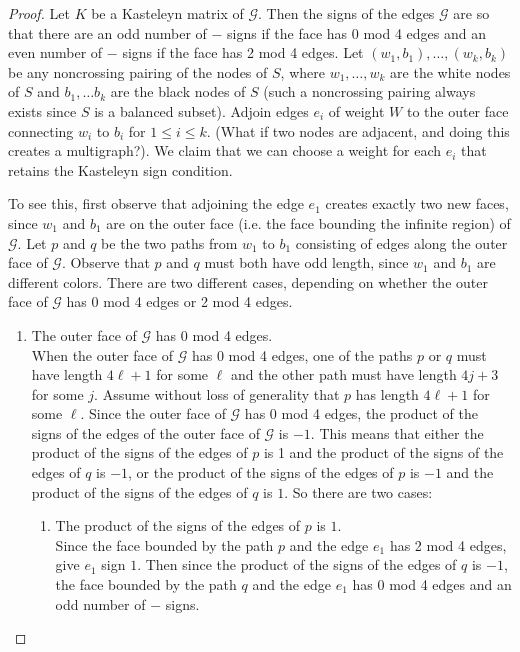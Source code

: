 \documentclass[11pt]{amsart}
\theoremstyle{definition}
\begin{document}
\begin{proof}
Let $K$ be a Kasteleyn matrix of $\mathcal{G}$. Then the signs of the edges $\mathcal{G}$ are so that there are an odd number of $-$ signs if the face has 0 mod 4 edges and an even number of $-$ signs if the face has 2 mod 4 edges. 
Let $(w_1, b_1), \ldots, (w_k, b_k)$ be any noncrossing pairing of the nodes of $S$, where $w_1, \ldots, w_k$ are the white nodes of $S$ and $b_1, \ldots b_k$ are the black nodes of $S$ (such a noncrossing pairing always exists since $S$ is a balanced subset). 
Adjoin edges $e_i$ of weight $W$ to the outer face connecting $w_i$ to $b_i$ for $1 \leq i \leq k$. (What if two nodes are adjacent, and doing this creates a multigraph?). We claim that we can choose a weight for each $e_i$ that retains the Kasteleyn sign condition. 

To see this, first observe that adjoining the edge $e_1$ creates exactly two new faces, since $w_1$ and $b_1$ are on the outer face (i.e. the face bounding the infinite region) of $\mathcal{G}$. Let $p$ and $q$ be the two paths from $w_1$ to $b_1$ consisting of edges along the outer face of $\mathcal{G}$. Observe that $p$ and $q$ must both have odd length, since $w_1$ and $b_1$ are different colors. There are two different cases, depending on whether the outer face of $\mathcal{G}$ has 0 mod 4 edges or 2 mod 4 edges. 
\begin{enumerate}
\item The outer face of $\mathcal{G}$ has 0 mod 4 edges. \\
When the outer face of $\mathcal{G}$ has 0 mod 4 edges, one of the paths $p$ or $q$ must have length $4 \ell + 1$ for some $\ell$ and the other path must have length $4 j + 3$ for some $j$. Assume without loss of generality that $p$ has length $4 \ell + 1$ for some $\ell$. Since the outer face of $\mathcal{G}$ has 0 mod 4 edges, the product of the signs of the edges of the outer face of $\mathcal{G}$ is $-1$. This means that either the product of the signs of the edges of $p$ is 1 and the product of the signs of the edges of $q$ is $-1$, or the product of the signs of the edges of $p$ is $-1$ and the product of the signs of the edges of $q$ is $1$. So there are two cases: 
\begin{enumerate}
\item The product of the signs of the edges of $p$ is $1$. \\
Since the face bounded by the path $p$ and the edge $e_1$ has 2 mod 4 edges, give $e_1$ sign $1$. Then since the product of the signs of the edges of $q$ is $-1$, the face bounded by the path $q$ and the edge $e_1$ has 0 mod 4 edges and an odd number of $-$ signs.

\end{enumerate}
\end{enumerate}
\end{proof}
\end{document}
